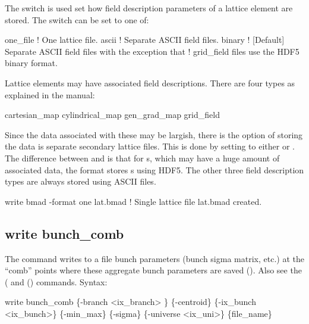 {{{{{{{{{{{{The  switch is used set how field description parameters of a lattice element
are stored. The  switch can be set to one of:
\begin{example}
  one_file      ! One lattice file.
  ascii         ! Separate ASCII field files.
  binary        ! [Default] Separate ASCII field files with the exception that
                !   grid_field files use the HDF5 binary format.
\end{example}
Lattice elements may have associated field descriptions. There are four types as explained in the
\bmad manual:
\begin{example}
  cartesian_map
  cylindrical_map
  gen_grad_map
  grid_field
\end{example}
Since the data associated with these may be largish, there is the option of storing the data is
separate secondary lattice files. This is done by setting  to either  or
. The difference between  and  is that for s, which
may have a huge amount of associated data, the  format stores s using
HDF5. The other three field description types are always stored using ASCII files.

\begin{example}
  write bmad -format one lat.bmad  ! Single lattice file lat.bmad created.
\end{example}


\subsection{write bunch_comb}
\label{s:write.bunch.comb}

The  command writes to a file bunch parameters (bunch sigma matrix, etc.) at
the ``comb'' points where these aggregate bunch parameters are saved (). Also see
the  ( and  ()
commands. Syntax:
\begin{example}
    write bunch_comb \{-branch <ix_branch> \} \{-centroid\} \{-ix_bunch <ix_bunch>\} 
                        \{-min_max\} \{-sigma\} \{-universe <ix_uni>\} \{file_name\}  
\end{example}

}}}}}}}}}}}}
